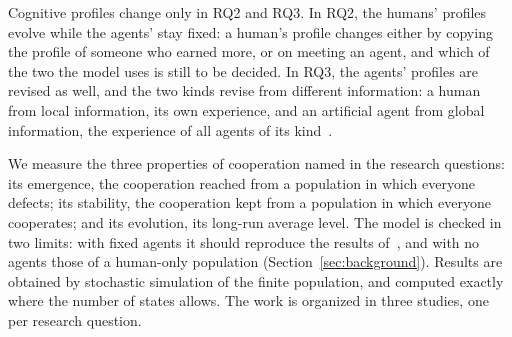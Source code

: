 
Cognitive profiles change only in RQ2 and RQ3. In RQ2, the humans' profiles evolve while the agents' stay fixed: a human's profile changes either by copying the profile of someone who earned more, or on meeting an agent, and which of the two the model uses is still to be decided. In RQ3, the agents' profiles are revised as well, and the two kinds revise from different information: a human from local information, its own experience, and an artificial agent from global information, the experience of all agents of its kind~\cite{pedreschiHumanAICoevolution2025}.

We measure the three properties of cooperation named in the research questions: its emergence, the cooperation reached from a population in which everyone defects; its stability, the cooperation kept from a population in which everyone cooperates; and its evolution, its long-run average level. The model is checked in two limits: with fixed agents it should reproduce the results of~\cite{sharmaSmallBotsBig2023, guoFacilitatingCooperationHumanagent2023}, and with no agents those of a human-only population (Section~\ref{sec:background}). Results are obtained by stochastic simulation of the finite population, and computed exactly where the number of states allows. The work is organized in three studies, one per research question.
